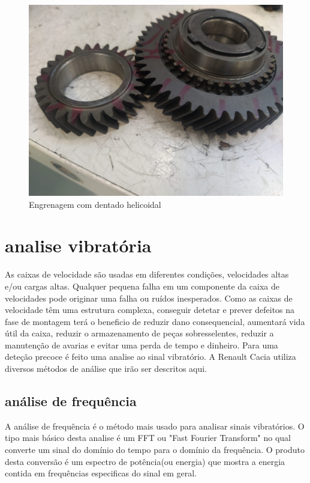\begin{figure}[H]
\centering
\includegraphics[scale=0.1]{figs/dentado_heli}
\caption{Engrenagem com dentado helicoidal}\label{dentado_helicoidal}
\end{figure}


\section{analise vibratória}
As caixas de velocidade são usadas em diferentes condições, velocidades altas e/ou cargas altas. Qualquer pequena falha em um componente da caixa de velocidades pode originar uma falha ou ruídos inesperados. Como as caixas de velocidade têm uma estrutura complexa, conseguir detetar e prever defeitos na fase de montagem terá o beneficio de reduzir dano consequencial, aumentará vida útil da caixa, reduzir o armazenamento de peças sobresselentes, reduzir a manutenção de avarias e evitar uma perda de tempo e dinheiro. Para uma deteção precoce é feito uma analise ao sinal vibratório. A Renault Cacia utiliza diversos métodos de análise que irão ser descritos aqui.


\subsection{análise de frequência}
A análise de frequência é o método mais usado para analisar sinais vibratórios. O tipo mais básico desta analise é um FFT ou "Fast Fourier Transform" no qual converte um sinal do domínio do tempo para o domínio da frequência. O produto desta conversão é um espectro de potência(ou energia) que mostra a energia contida em frequências especificas do sinal em geral.

